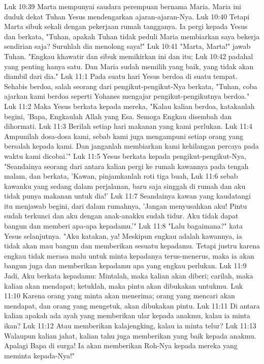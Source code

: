 Luk 10:39  Marta mempunyai saudara perempuan bernama Maria. Maria ini duduk dekat Tuhan Yesus mendengarkan ajaran-ajaran-Nya.
Luk 10:40  Tetapi Marta sibuk sekali dengan pekerjaan rumah tangganya. Ia pergi kepada Yesus dan berkata, "Tuhan, apakah Tuhan tidak peduli Maria membiarkan saya bekerja sendirian saja? Suruhlah dia menolong saya!"
Luk 10:41  "Marta, Marta!" jawab Tuhan. "Engkau khawatir dan sibuk memikirkan ini dan itu;
Luk 10:42  padahal yang penting hanya satu. Dan Maria sudah memilih yang baik, yang tidak akan diambil dari dia."
Luk 11:1  Pada suatu hari Yesus berdoa di suatu tempat. Sehabis berdoa, salah seorang dari pengikut-pengikut-Nya berkata, "Tuhan, coba ajarkan kami berdoa seperti Yohanes mengajar pengikut-pengikutnya berdoa."
Luk 11:2  Maka Yesus berkata kepada mereka, "Kalau kalian berdoa, katakanlah begini, 'Bapa, Engkaulah Allah yang Esa. Semoga Engkau disembah dan dihormati.
Luk 11:3  Berilah setiap hari makanan yang kami perlukan.
Luk 11:4  Ampunilah dosa-dosa kami, sebab kami juga mengampuni setiap orang yang bersalah kepada kami. Dan janganlah membiarkan kami kehilangan percaya pada waktu kami dicobai.'"
Luk 11:5  Yesus berkata kepada pengikut-pengikut-Nya, "Seandainya seorang dari antara kalian pergi ke rumah kawannya pada tengah malam, dan berkata, 'Kawan, pinjamkanlah roti tiga buah,
Luk 11:6  sebab kawanku yang sedang dalam perjalanan, baru saja singgah di rumah dan aku tidak punya makanan untuk dia!'
Luk 11:7  Seandainya kawan yang kaudatangi itu menjawab begini, dari dalam rumahnya, 'Jangan menyusahkan aku! Pintu sudah terkunci dan aku dengan anak-anakku sudah tidur. Aku tidak dapat bangun dan memberi apa-apa kepadamu.'"
Luk 11:8  "Lalu bagaimana?" kata Yesus selanjutnya. "Aku katakan, ya! Meskipun engkau adalah kawannya, ia tidak akan mau bangun dan memberikan sesuatu kepadamu. Tetapi justru karena engkau tidak merasa malu untuk minta kepadanya terus-menerus, maka ia akan bangun juga dan memberikan kepadamu apa yang engkau perlukan.
Luk 11:9  Jadi, Aku berkata kepadamu: Mintalah, maka kalian akan diberi; carilah, maka kalian akan mendapat; ketuklah, maka pintu akan dibukakan untukmu.
Luk 11:10  Karena orang yang minta akan menerima; orang yang mencari akan mendapat, dan orang yang mengetuk, akan dibukakan pintu.
Luk 11:11  Di antara kalian apakah ada ayah yang memberikan ular kepada anakmu, kalau ia minta ikan?
Luk 11:12  Atau memberikan kalajengking, kalau ia minta telur?
Luk 11:13  Walaupun kalian jahat, kalian tahu juga memberikan yang baik kepada anakmu. Apalagi Bapa di surga! Ia akan memberikan Roh-Nya kepada mereka yang meminta kepada-Nya!"
